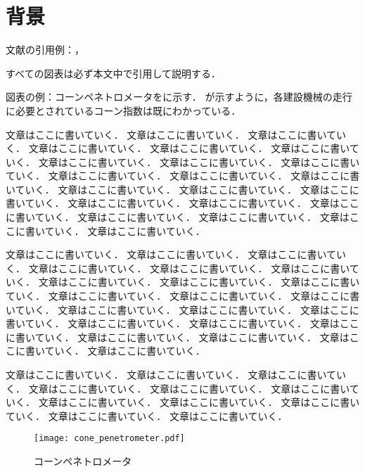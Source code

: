 \documentclass[../main]{subfiles}
\begin{document}
\graphicspath{{../figures/chap1/}}

\section{背景}
\label{sec:intro_background}
文献の引用例：\cite{cao2014main1-1-4-3}，\cite{Kiribayashi2018}

すべての図表は必ず本文中で引用して説明する．

図表の例：コーンペネトロメータをに示す．
が示すように，各建設機械の走行に必要とされているコーン指数は既にわかっている．

文章はここに書いていく．
文章はここに書いていく．
文章はここに書いていく．
文章はここに書いていく．
文章はここに書いていく．
文章はここに書いていく．
文章はここに書いていく．
文章はここに書いていく．
文章はここに書いていく．
文章はここに書いていく．
文章はここに書いていく．
文章はここに書いていく．
文章はここに書いていく．
文章はここに書いていく．
文章はここに書いていく．
文章はここに書いていく．
文章はここに書いていく．
文章はここに書いていく．
文章はここに書いていく．
文章はここに書いていく．
文章はここに書いていく．
文章はここに書いていく．

文章はここに書いていく．
文章はここに書いていく．
文章はここに書いていく．
文章はここに書いていく．
文章はここに書いていく．
文章はここに書いていく．
文章はここに書いていく．
文章はここに書いていく．
文章はここに書いていく．
文章はここに書いていく．
文章はここに書いていく．
文章はここに書いていく．
文章はここに書いていく．
文章はここに書いていく．
文章はここに書いていく．
文章はここに書いていく．
文章はここに書いていく．
文章はここに書いていく．
文章はここに書いていく．
文章はここに書いていく．
文章はここに書いていく．
文章はここに書いていく．

文章はここに書いていく．
文章はここに書いていく．
文章はここに書いていく．
文章はここに書いていく．
文章はここに書いていく．
文章はここに書いていく．
文章はここに書いていく．
文章はここに書いていく．
文章はここに書いていく．
文章はここに書いていく．
文章はここに書いていく．


\begin{figure}[t]
  \centering
  \texttt{[image: cone\_penetrometer.pdf]}
  \caption{コーンペネトロメータ}
  \label{fig:cone_penetrometer}
\end{figure}
\end{document}
